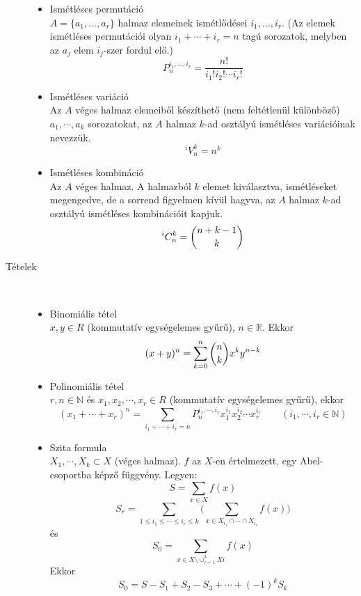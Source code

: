 \documentclass[margin=0px]{article}
\newcommand{\N}{\mathbb{N}}
\newcommand{\R}{\mathbb{R}}
\begin{document}
\begin{description}
\begin{itemize}
            \item Ismétléses permutáció \\
                  $A = \{a_1,\dotsc,a_r\}$ halmaz elemeinek ismétlődései $i_1,\dotsc,i_r$. (Az elemek ismétléses permutációi olyan $i_1+\cdots+i_r = n$ tagú sorozatok, melyben az $a_j$ elem $i_j$-szer fordul elő.)
                  \[P_n^{i_1,\dotsc,i_r} = \frac{n!}{i_1!i_2!\cdots i_r!}\]
            \item Ismétléses variáció \\
                  Az $A$ véges halmaz elemeiből készíthető (nem feltétlenül különböző)  $a_1,\cdots,a_k$ sorozatokat, az $A$ halmaz $k$-ad osztályú ismétléses variációinak nevezzük.
                  \[^iV_n^k = n^k\]
            \item Ismétléses kombináció \\
                  Az $A$ véges halmaz. A halmazból $k$ elemet kiválasztva, ismétléseket megengedve, de a sorrend figyelmen kívül hagyva, az $A$ halmaz $k$-ad osztályú ismétléses kombinációit kapjuk.
                  \[^iC_n^k = \dbinom{n+k-1}{k} \]
        \end{itemize}
    \item[Tételek] \hfill \\
        \begin{itemize}
            \item Binomiális tétel \\
                  $x,y \in R$  (kommutatív egységelemes gyűrű), $n\in\R$. Ekkor
                  \[(x+y)^n = \sum\limits_{k=0}^n\dbinom{n}{k}x^ky^{n-k} \]
            \item Polinomiális tétel \\
                  $r,n\in\N$ és $x_1, x_2, \cdots, x_r \in R$ (kommutatív egységelemes gyűrű), ekkor
                  \[(x_1+\cdots+x_r)^n = \sum\limits_{i_1+\cdots+i_r = n}P_n^{i_1,\cdots,i_r}x_1^{i_1}x_2^{i_2}\cdots x_r^{i_r} \qquad (i_1,\cdots,i_r \in\N)\]
            \item Szita formula \\
                  $X_1,\cdots,X_k \subset X$ (véges halmaz). $f$ az $X$-en értelmezett, egy Abel-csoportba képző függvény. Legyen:
                  \[S=\sum\limits_{x\in X}f(x)\]
                  \[ S_r = \sum\limits_{1\leq i_1 \leq \cdots \leq i_r \leq k}\Bigg(\sum\limits_{x \in X_{i_1} \cap \cdots \cap X_{i_r}}f(x)\Bigg) \]
                  és
                  \[S_0 = \sum\limits_{x\in X \setminus \cup_{i=1}^k Xi}f(x)\]
                  Ekkor
                  \[S_0 = S - S_1+S_2-S_3+\cdots+(-1)^kS_k \]
        \end{itemize}
\end{description}
\end{document}
